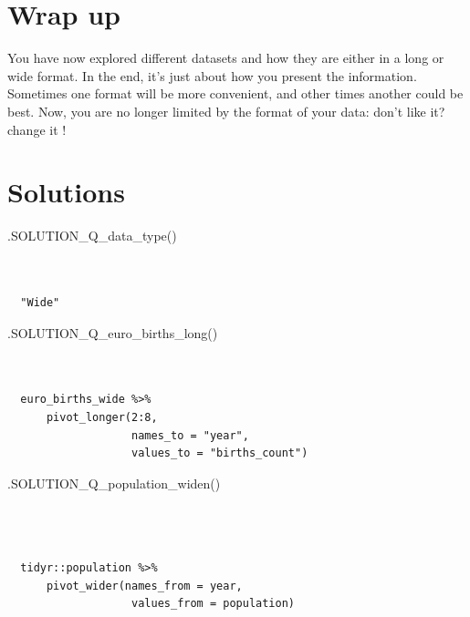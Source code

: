 \documentclass[
  letterpaper,
  DIV=11,
  numbers=noendperiod]{scrreprt}
\newenvironment{Shaded}{\begin{snugshade}}{\end{snugshade}}
\newcommand{\FunctionTok}[1]{\textcolor[rgb]{0.28,0.35,0.67}{#1}}
\newcommand{\NormalTok}[1]{\textcolor[rgb]{0.00,0.23,0.31}{#1}}
\begin{document}
\section{Wrap up}\label{wrap-up-8}

You have now explored different datasets and how they are either in a
long or wide format. In the end, it's just about how you present the
information. Sometimes one format will be more convenient, and other
times another could be best. Now, you are no longer limited by the
format of your data: don't like it? change it !

\section{Solutions}\label{solutions-7}

\begin{Shaded}
\begin{Highlighting}[]
\FunctionTok{.SOLUTION\_Q\_data\_type}\NormalTok{()}
\end{Highlighting}
\end{Shaded}

\begin{verbatim}


  "Wide"
\end{verbatim}

\begin{Shaded}
\begin{Highlighting}[]
\FunctionTok{.SOLUTION\_Q\_euro\_births\_long}\NormalTok{()}
\end{Highlighting}
\end{Shaded}

\begin{verbatim}


  euro_births_wide %>% 
      pivot_longer(2:8, 
                   names_to = "year", 
                   values_to = "births_count")
\end{verbatim}

\begin{Shaded}
\begin{Highlighting}[]
\FunctionTok{.SOLUTION\_Q\_population\_widen}\NormalTok{()}
\end{Highlighting}
\end{Shaded}

\begin{verbatim}


  
  tidyr::population %>% 
      pivot_wider(names_from = year,
                   values_from = population)
\end{verbatim}
\end{document}
